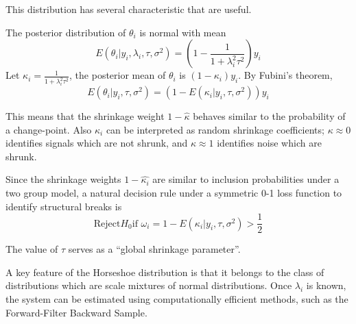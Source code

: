 \documentclass{article}
\begin{document}
This distribution has several characteristic that are useful.

The posterior distribution of $\theta_{i}$ is normal with mean
\begin{equation}
  \label{eq:4}
  E(\theta_{i} | y_{i}, \lambda_{i}, \tau, \sigma^{2}) = \left( 1 - \frac{1}{1 + \lambda_{i}^{2} \tau^{2}} \right) y_{i}
\end{equation}
Let $\kappa_{i} = \frac{1}{1 + \lambda_{i}^{2} \tau^{2}}$, the posterior mean of $\theta_{i}$ is $(1 - \kappa_{i}) y_{i}$. 
By Fubini's theorem,
\begin{equation}
  \label{eq:4}
  E(\theta_{i} | y_{i}, \tau, \sigma^{2}) = \left(1 - E(\kappa_{i} | y_{i}, \tau, \sigma^{2 })\right)y_{i}
\end{equation}

This means that the shrinkage weight $1 - \hat{\kappa}$ behaves similar to the probability of a change-point.
Also $\kappa_{i}$ can be interpreted as random shrinkage coefficients; $\kappa \approx 0$ identifies signals which 
are not shrunk, and $\kappa \approx 1$ identifies noise which are shrunk.

Since the shrinkage weights $1 - \hat{\kappa_{i}}$ are similar to inclusion probabilities under a two group model, 
a natural decision rule under a symmetric 0-1 loss function to identify structural breaks is 
\begin{equation}
  \label{eq:5}
  \text{Reject} H_{0} \text{if $\omega_{i} = 1 - E(\kappa_{i} | y_{i}, \tau, \sigma^{2})$} > \frac{1}{2}
\end{equation}

The value of $\tau$ serves as a ``global shrinkage parameter''. 


A key feature of the Horseshoe distribution is that it belongs to the class of distributions which are scale mixtures of normal distributions. 
Once $\lambda_{i}$ is known, the system can be estimated using computationally efficient methods, such as the Forward-Filter Backward Sample.
\end{document}
